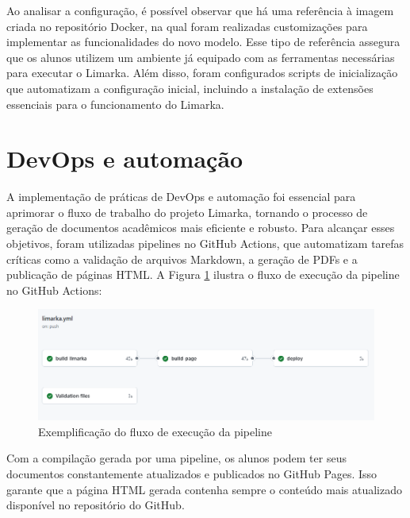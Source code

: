 \documentclass[
	12pt,				%
	oneside,			%
	a4paper,			%
	english,			%
	french,				%
	spanish,			%
	brazil				%
	]{abntex2}
\begin{document}
Ao analisar a configuração, é possível observar que há uma referência à
imagem criada no repositório Docker, na qual foram realizadas
customizações para implementar as funcionalidades do novo modelo. Esse
tipo de referência assegura que os alunos utilizem um ambiente já
equipado com as ferramentas necessárias para executar o Limarka. Além
disso, foram configurados scripts de inicialização que automatizam a
configuração inicial, incluindo a instalação de extensões essenciais
para o funcionamento do Limarka.

\hypertarget{devops-e-automauxe7uxe3o}{%
\section{DevOps e automação}\label{devops-e-automauxe7uxe3o}}

A implementação de práticas de DevOps e automação foi essencial para
aprimorar o fluxo de trabalho do projeto Limarka, tornando o processo de
geração de documentos acadêmicos mais eficiente e robusto. Para alcançar
esses objetivos, foram utilizadas pipelines no GitHub Actions, que
automatizam tarefas críticas como a validação de arquivos Markdown, a
geração de PDFs e a publicação de páginas HTML. A Figura
\ref{github_action_limarka} ilustra o fluxo de execução da pipeline no
GitHub Actions:

\begin{figure}[htbp]
\hypertarget{github_action_limarka}{%
\caption{Exemplificação do fluxo de execução da pipeline}\label{github_action_limarka}
\begin{center}
\includegraphics[scale=0.6]{imagens/screenshot/github-action-limarka.png}
\end{center}
}
\end{figure}

Com a compilação gerada por uma pipeline, os alunos podem ter seus
documentos constantemente atualizados e publicados no GitHub Pages. Isso
garante que a página HTML gerada contenha sempre o conteúdo mais
atualizado disponível no repositório do GitHub.
\end{document}
